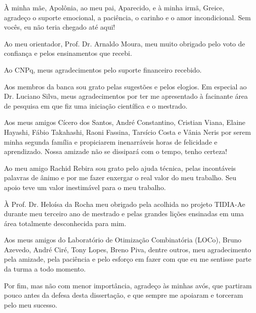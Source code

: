\documentclass[12pt,twoside]{report} %
\begin{document}
À minha mãe, Apolônia, ao meu pai, Aparecido, e à minha irmã, Greice, agradeço o suporte emocional, a paciência, o carinho e o amor incondicional. Sem vocês, eu não teria chegado até aqui!

Ao meu orientador, Prof. Dr. Arnaldo Moura, meu muito obrigado pelo voto de confiança e pelos ensinamentos que recebi.

Ao CNPq, meus agradecimentos pelo suporte financeiro recebido.

Aos membros da banca sou grato pelas sugestões e pelos elogios. Em especial ao Dr. Luciano Silva, meus agradecimentos por ter me apresentado à facinante área de pesquisa em que fiz uma iniciação científica e o mestrado.

Aos meus amigos Cícero dos Santos, André Constantino, Cristian Viana, Elaine Hayashi, Fábio Takahashi, Raoni Fassina, Tarsício Costa e Vânia Neris por serem minha segunda família e propiciarem inenarráveis horas de felicidade e aprendizado. Nossa amizade não se dissipará com o tempo, tenho certeza!

Ao meu amigo Rachid Rebira sou grato pelo ajuda técnica, pelas incontáveis palavras de ânimo e por me fazer enxergar o real valor do meu trabalho. Seu apoio teve um valor inestimável para o meu trabalho.

À Prof. Dr. Heloísa da Rocha meu obrigado pela acolhida no projeto TIDIA-Ae durante meu terceiro ano de mestrado e pelas grandes lições ensinadas em uma área totalmente desconhecida para mim.

Aos meus amigos do Laboratório de Otimização Combinatória (LOCo), Bruno Azevedo, André Ciré, Tony Lopes, Breno Piva, dentre outros, meu agradecimento pela amizade, pela paciência e pelo esforço em fazer com que eu me sentisse parte da turma a todo momento.

Por fim, mas não com menor importância, agradeço às minhas avós, que partiram pouco antes da defesa desta dissertação, e que sempre me apoiaram e torceram pelo meu sucesso.

\afterpreface %









\clearpage
{}
{}

\appendix
\singlespacing
\renewcommand{\appendixpagename}{Apêndices}





\end{document}
